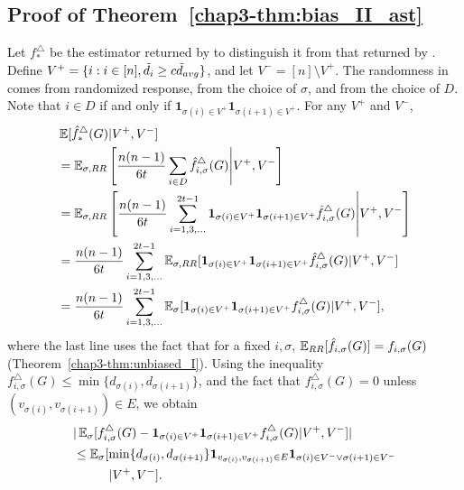 \subsection{Proof of Theorem~\ref{chap3-thm:bias_II_ast}}
\label{chap3-sub:bias_II_ast_proof}
Let $f^\triangle_*$ be the estimator returned by \AlgWSTriVR{} to distinguish
it from that returned by \AlgWSTri{}.
Define $V^+ = \{i : i \in [n], \tilde{d}_i \geq c \tilde{d}_{avg} \}$, and let $V^- = [n]
\setminus V^+$.
The randomness in \AlgWSTriVR{} comes
from randomized response, from the choice of $\sigma$, and from the choice of
$D$. Note that $i \in D$ if and only if $\textbf{1}_{\sigma(i) \in V^+}
\textbf{1}_{\sigma(i+1) \in V^+}$. For any $V^+$ and $V^-$,
\begin{align}
  &\operatorname{\mathbb{E}}[\hat{f}^\triangle_*(G) | V^+,V^-] \nonumber \\
  &= \operatorname{\mathbb{E}}_{\sigma,RR}\left[\frac{n(n-1)}{6t}\sum_{i \in D}
  \hat{f}^\triangle_{i, \sigma}(G) \middle| V^+,V^- \right] \nonumber \\
  &= \operatorname{\mathbb{E}}_{\sigma,RR}\left[\frac{n(n-1)}{6t}\sum_{i = 1,3,\ldots}^{2t-1}
  \textbf{1}_{\sigma(i) \in V^+}\textbf{1}_{\sigma(i+1) \in V^+} \hat{f}^\triangle_{i,
  \sigma}(G) \middle| V^+,V^- \right] \nonumber \\
  &= \frac{n(n-1)}{6t}\sum_{i = 1,3,\ldots}^{2t-1}
  \operatorname{\mathbb{E}}_{\sigma,RR}[\textbf{1}_{\sigma(i) \in V^+}\textbf{1}_{\sigma(i+1) \in V^+}
  \hat{f}^\triangle_{i, \sigma}(G) | V^+,V^-] \nonumber \\
  &= \frac{n(n-1)}{6t}\sum_{i = 1,3,\ldots}^{2t-1}
  \operatorname{\mathbb{E}}_\sigma[\textbf{1}_{\sigma(i) \in V^+}\textbf{1}_{\sigma(i+1) \in V^+} f^\triangle_{i,
  \sigma}(G) | V^+,V^-], \label{chap3-eq:exp-expand}
\end{align}
where the last line uses the fact that for a fixed $i,\sigma$,
$\operatorname{\mathbb{E}}_{RR}[\hat{f}_{i,\sigma}(G)] = f_{i,\sigma}(G)$
(Theorem~\ref{chap3-thm:unbiased_I}). Using the inequality $f_{i,\sigma}^\triangle(G)
\leq \min\{d_{\sigma(i)}, \allowbreak d_{\sigma(i+1)}\}$, and the fact that
$f_{i,\sigma}^\triangle(G) = 0$ unless $(v_{\sigma(i)},v_{\sigma(i+1)}) \in E$, we obtain
\begin{align*}
  &|\E_{\sigma}[f_{i,\sigma}^\triangle(G) - \textbf{1}_{\sigma(i)\in V^+}
  \textbf{1}_{\sigma(i+1)\in V^+} f_{i,\sigma}^\triangle(G)|V^+,V^-]| \\
  &\leq
  \E_{\sigma}[\min\{d_{\sigma(i)}, d_{\sigma(i+1)}\}\textbf{1}_{v_{\sigma(i)},v_{\sigma(i+1)} \in E}\textbf{1}_{\sigma(i) \in V^-
  \vee \sigma(i+1) \in V^-} \\
  & \hspace{10mm} | V^+,V^-].
\end{align*}
